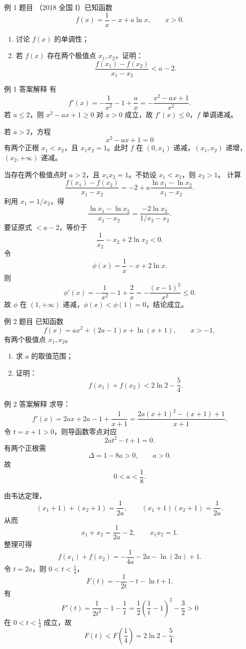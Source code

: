 ﻿\documentclass[aspectratio=169,10pt]{ctexbeamer}
\begin{document}
\begin{frame}{例 1 题目}
\small
（2018 全国 I）已知函数
\[
f(x)=\frac1x-x+a\ln x,\qquad x>0.
\]
\begin{enumerate}
  \item 讨论 $f(x)$ 的单调性；
  \item 若 $f(x)$ 存在两个极值点 $x_1,x_2$，证明：
  \[
  \frac{f(x_1)-f(x_2)}{x_1-x_2}<a-2.
  \]
\end{enumerate}
\end{frame}

\begin{frame}[allowframebreaks]{例 1 答案解释}
\small
有
\[
f'(x)=-\frac1{x^2}-1+\frac ax
=-\frac{x^2-ax+1}{x^2}.
\]
若 $a\le2$，则 $x^2-ax+1\ge0$ 对 $x>0$ 成立，故 $f'(x)\le0$，$f$ 单调递减。

若 $a>2$，方程
\[
x^2-ax+1=0
\]
有两个正根 $x_1<x_2$，且 $x_1x_2=1$。此时 $f$ 在 $(0,x_1)$ 递减，$(x_1,x_2)$ 递增，$(x_2,+\infty)$ 递减。

\framebreak

当存在两个极值点时 $a>2$，且 $x_1x_2=1$。不妨设 $x_1<x_2$，则 $x_2>1$。
计算
\[
\frac{f(x_1)-f(x_2)}{x_1-x_2}
=-2+a\frac{\ln x_1-\ln x_2}{x_1-x_2}.
\]
利用 $x_1=1/x_2$，得
\[
\frac{\ln x_1-\ln x_2}{x_1-x_2}
=\frac{-2\ln x_2}{1/x_2-x_2}.
\]
要证原式 $<a-2$，等价于
\[
\frac1{x_2}-x_2+2\ln x_2<0.
\]
令
\[
\phi(x)=\frac1x-x+2\ln x.
\]
则
\[
\phi'(x)=-\frac1{x^2}-1+\frac2x=-\frac{(x-1)^2}{x^2}\le0.
\]
故 $\phi$ 在 $(1,+\infty)$ 递减，$\phi(x)<\phi(1)=0$，结论成立。
\end{frame}

\begin{frame}{例 2 题目}
\small
已知函数
\[
f(x)=ax^2+(2a-1)x+\ln(x+1),\qquad x>-1,
\]
有两个极值点 $x_1,x_2$。
\begin{enumerate}
  \item 求 $a$ 的取值范围；
  \item 证明：
  \[
  f(x_1)+f(x_2)<2\ln2-\frac54.
  \]
\end{enumerate}
\end{frame}

\begin{frame}[allowframebreaks]{例 2 答案解释}
\small
求导：
\[
f'(x)=2ax+2a-1+\frac1{x+1}
=\frac{2a(x+1)^2-(x+1)+1}{x+1}.
\]
令 $t=x+1>0$，则导函数零点对应
\[
2at^2-t+1=0.
\]
有两个正根需
\[
\Delta=1-8a>0,\qquad a>0.
\]
故
\[
\boxed{0<a<\frac18}.
\]

\framebreak

由韦达定理，
\[
(x_1+1)+(x_2+1)=\frac1{2a},\qquad
(x_1+1)(x_2+1)=\frac1{2a}.
\]
从而
\[
x_1+x_2=\frac1{2a}-2,\qquad x_1x_2=1.
\]
整理可得
\[
f(x_1)+f(x_2)
 =-\frac1{4a}-2a-\ln(2a)+1.
\]
令 $t=2a$，则 $0<t<\frac14$，
\[
F(t)=-\frac1{2t}-t-\ln t+1.
\]
有
\[
F'(t)=\frac1{2t^2}-1-\frac1t
=\frac12\left(\frac1t-1\right)^2-\frac32>0
\]
在 $0<t<\frac14$ 成立，故
\[
F(t)<F\left(\frac14\right)=2\ln2-\frac54.
\]
\end{frame}
\end{document}
